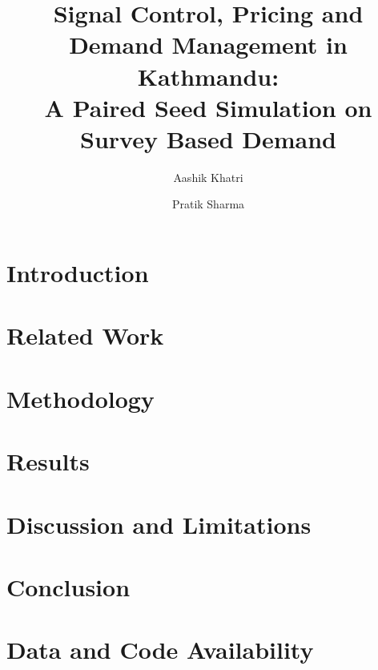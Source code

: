 \documentclass[11pt,a4paper]{article}
\title{Signal Control, Pricing and Demand Management in Kathmandu:\\
A Paired Seed Simulation on Survey Based Demand}
\author{Aashik Khatri \and Pratik Sharma}
\date{}
\begin{document}
\maketitle


\section{Introduction}


\section{Related Work}


\section{Methodology}


\section{Results}


\section{Discussion and Limitations}


\section{Conclusion}


\section*{Data and Code Availability}




\end{document}
